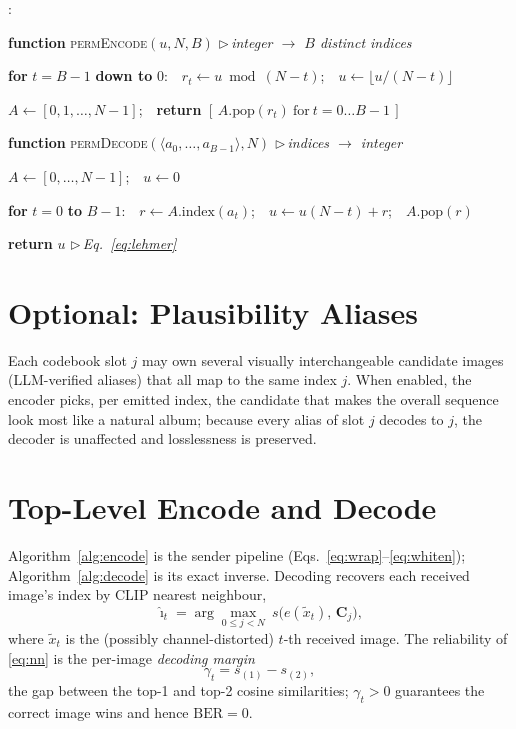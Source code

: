 \documentclass[11pt]{article}
\newcounter{algln}
\newenvironment{pseudo}{%
  \begin{list}{\footnotesize\arabic{algln}:}{%
    \usecounter{algln}%
    \setlength{\leftmargin}{2.4em}\setlength{\labelwidth}{1.7em}%
    \setlength{\labelsep}{0.4em}\setlength{\itemsep}{1.5pt}%
    \setlength{\parsep}{0pt}\setlength{\topsep}{3pt}\small}%
}{\end{list}}
\newcommand{\kw}[1]{\textbf{#1}}
\newcommand{\Ind}{\hspace*{1.3em}}
\newcommand{\Cmt}[1]{\hfill{\footnotesize$\triangleright$\,\textit{#1}}}
\begin{document}
\begin{algorithm}[t]
\caption{Lehmer block coding: \textsc{permEncode} / \textsc{permDecode}}\label{alg:lehmer}
\begin{pseudo}
\item \kw{function} \textsc{permEncode}$(u,N,B)$ \Cmt{integer $\to$ $B$ distinct indices}
\item \Ind \kw{for} $t=B-1$ \kw{down to} $0$:\ \ $r_t\gets u\bmod(N-t)$;\ \ $u\gets\lfloor u/(N-t)\rfloor$
\item \Ind $A\gets[0,1,\dots,N-1]$;\ \ \kw{return} $[\,A.\text{pop}(r_t)\ \text{for}\ t=0\dots B-1\,]$
\item \kw{function} \textsc{permDecode}$(\langle a_0,\dots,a_{B-1}\rangle,N)$ \Cmt{indices $\to$ integer}
\item \Ind $A\gets[0,\dots,N-1]$;\ \ $u\gets0$
\item \Ind \kw{for} $t=0$ \kw{to} $B-1$:\ \ $r\gets A.\text{index}(a_t)$;\ \ $u\gets u(N-t)+r$;\ \ $A.\text{pop}(r)$
\item \Ind \kw{return} $u$ \Cmt{Eq.~\eqref{eq:lehmer}}
\end{pseudo}
\end{algorithm}

\section{Optional: Plausibility Aliases}
Each codebook slot $j$ may own several visually interchangeable candidate images
(LLM-verified aliases) that all map to the same index $j$. When enabled, the
encoder picks, per emitted index, the candidate that makes the overall sequence
look most like a natural album; because every alias of slot $j$ decodes to $j$,
the decoder is unaffected and losslessness is preserved.

\section{Top-Level Encode and Decode}
Algorithm~\ref{alg:encode} is the sender pipeline (Eqs.~\eqref{eq:wrap}--\eqref{eq:whiten});
Algorithm~\ref{alg:decode} is its exact inverse. Decoding recovers each received
image's index by CLIP nearest neighbour,
\begin{equation}
  \hat{\imath}_t=\arg\max_{0\le j<N}\ s\big(e(\tilde x_t),\,\mathbf{C}_j\big),
  \label{eq:nn}
\end{equation}
where $\tilde x_t$ is the (possibly channel-distorted) $t$-th received image. The
reliability of \eqref{eq:nn} is the per-image \emph{decoding margin}
\begin{equation}
  \gamma_t=s_{(1)}-s_{(2)},
  \label{eq:margin}
\end{equation}
the gap between the top-1 and top-2 cosine similarities; $\gamma_t>0$ guarantees
the correct image wins and hence $\mathrm{BER}=0$.
\end{document}
